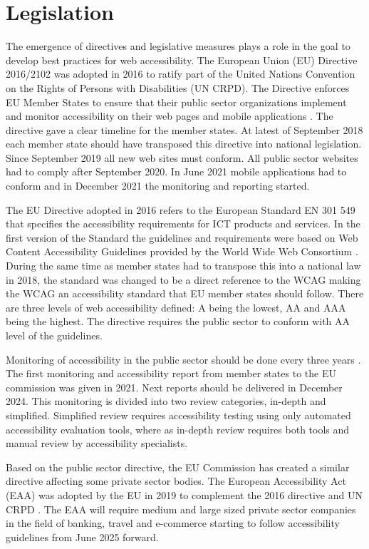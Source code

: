 \section{Legislation}

The emergence of directives and legislative measures plays a role in the goal to develop best practices for web accessibility. The European Union (EU) Directive 2016/2102 was adopted in 2016 to ratify part of the United Nations Convention on the Rights of Persons with Disabilities (UN CRPD). The Directive enforces EU Member States to ensure that their public sector organizations implement and monitor accessibility on their web pages and mobile applications \citep{eudirective2016}. The directive gave a clear timeline for the member states. At latest of September 2018 each member state should have transposed this directive into national legislation. Since September 2019 all new web sites must conform. All public sector websites had to comply after September 2020. In June 2021 mobile applications had to conform and in December 2021 the monitoring and reporting started. 

The EU Directive adopted in 2016 refers to the European Standard EN 301 549 that specifies the accessibility requirements for ICT products and services. In the first version of the Standard the guidelines and requirements were based on Web Content Accessibility Guidelines provided by the World Wide Web Consortium \citep{wcagadoptioneurope}. During the same time as member states had to transpose this into a national law in 2018, the standard was changed to be a direct reference to the WCAG making the WCAG an accessibility standard that EU member states should follow. There are three levels of web accessibility defined: A being the lowest, AA and AAA being the highest. The directive requires the public sector to conform with AA level of the guidelines.

Monitoring of accessibility in the public sector should be done every three years \citep{eudirectivemonitoring}. The first monitoring and accessibility report from member states to the EU commission was given in 2021. Next reports should be delivered in December 2024. This monitoring is divided into two review categories, in-depth and simplified. Simplified review requires accessibility testing using only automated accessibility evaluation tools, where as in-depth review requires both tools and manual review by accessibility specialists. 

Based on the public sector directive, the EU Commission has created a similar directive affecting some private sector bodies. The European Accessibility Act (EAA) was adopted by the EU in 2019 to complement the 2016 directive and UN CRPD \citep{eudirective2019}. The EAA will require medium and large sized private sector companies in the field of banking, travel and e-commerce starting to follow accessibility guidelines from June 2025 forward.


